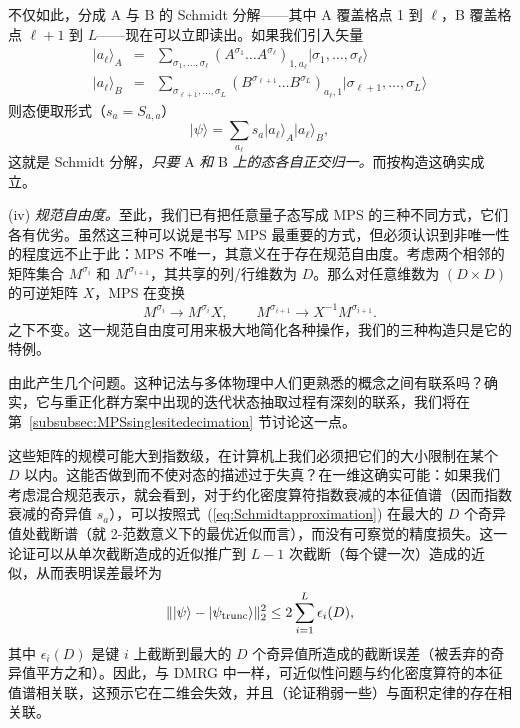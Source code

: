 \documentclass[a4paper,10pt,oneside,onecolumn,1p,times]{elsarticle}
\newcommand{\ket}[1]{\mbox{$| #1  \rangle$}}
\begin{document}
不仅如此，分成 A 与 B 的 Schmidt 分解——其中 A 覆盖格点 1 到 $\ell$，B 覆盖格点 $\ell+1$ 到 $L$——现在可以立即读出。如果我们引入矢量
\begin{eqnarray}
\ket{a_\ell}_A &=& \sum_{\sigma_1,\ldots,\sigma_\ell}
(A^{\sigma_1} \ldots A^{\sigma_\ell})_{1,a_\ell}
 \ket{\sigma_1,\ldots,\sigma_\ell} \\
\ket{a_\ell}_B &=&  \sum_{\sigma_{\ell+1},\ldots,\sigma_L} 
(B^{\sigma_{\ell+1}} \ldots B^{\sigma_L})_{a_\ell,1}
\ket{\sigma_{\ell+1},\ldots,\sigma_L}
\end{eqnarray}
则态便取形式（$s_a = S_{a,a}$）
\begin{equation}
\ket{\psi} = \sum_{a_\ell} s_a \ket{a_\ell}_A \ket{a_\ell}_B ,
\end{equation}
这就是 Schmidt 分解，{\em 只要} A {\em 和} B {\em 上的态各自正交归一。}而按构造这确实成立。

(iv) {\em 规范自由度。}至此，我们已有把任意量子态写成 MPS 的三种不同方式，它们各有优劣。虽然这三种可以说是书写 MPS 最重要的方式，但必须认识到非唯一性的程度远不止于此：MPS 不唯一，其意义在于存在规范自由度。考虑两个相邻的矩阵集合 $M^{\sigma_i}$ 和 $M^{\sigma_{i+1}}$，其共享的列/行维数为 $D$。那么对任意维数为 $(D\times D)$ 的可逆矩阵 $X$，MPS 在变换
\begin{equation}
M^{\sigma_i} \rightarrow M^{\sigma_i} X, \quad \quad M^{\sigma_{i+1}} \rightarrow X^{-1}M^{\sigma_{i+1}} .
\end{equation}
之下不变。这一规范自由度可用来极大地简化各种操作，我们的三种构造只是它的特例。
 
由此产生几个问题。这种记法与多体物理中人们更熟悉的概念之间有联系吗？确实，它与重正化群方案中出现的迭代状态抽取过程有深刻的联系，我们将在第~\ref{subsubsec:MPSsinglesitedecimation} 节讨论这一点。

这些矩阵的规模可能大到指数级，在计算机上我们必须把它们的大小限制在某个 $D$ 以内。这能否做到而不使对态的描述过于失真？在一维这确实可能：如果我们考虑混合规范表示，就会看到，对于约化密度算符指数衰减的本征值谱（因而指数衰减的奇异值 $s_a$），可以按照式~(\ref{eq:Schmidtapproximation}) 在最大的 $D$ 个奇异值处截断谱（就 2-范数意义下的最优近似而言），而没有可察觉的精度损失。这一论证可以从单次截断造成的近似推广到 $L-1$ 次截断（每个键一次）造成的近似，从而表明误差最坏为 \cite{Verstraete06}
\begin{equation}
\| \ket{\psi} - \ket{\psi_{{\rm trunc}}} \|_2^2 \leq 2 \sum_{i=1}^L \epsilon_i(D) ,
\end{equation}
其中 $\epsilon_i(D)$ 是键 $i$ 上截断到最大的 $D$ 个奇异值所造成的截断误差（被丢弃的奇异值平方之和）。因此，与 DMRG 中一样，可近似性问题与约化密度算符的本征值谱相关联，这预示它在二维会失效，并且（论证稍弱一些）与面积定律的存在相关联。
\end{document}
